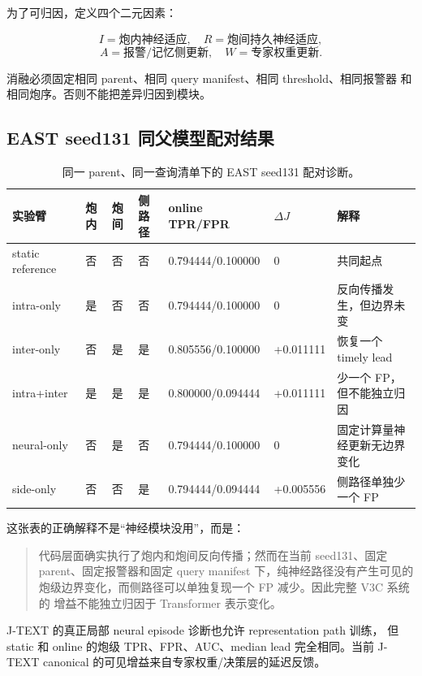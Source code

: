 \documentclass[11pt,a4paper]{article}
\begin{document}
为了可归因，定义四个二元因素：

\[
I=\text{炮内神经适应},\quad
R=\text{炮间持久神经适应},
\]
\[
A=\text{报警/记忆侧更新},\quad
W=\text{专家权重更新}.
\]

消融必须固定相同 parent、相同 query manifest、相同 threshold、相同报警器
和相同炮序。否则不能把差异归因到模块。

\subsection{EAST seed131 同父模型配对结果}

\begin{table}[H]
\centering
\caption{同一 parent、同一查询清单下的 EAST seed131 配对诊断。}
\label{tab:ablation}
\small
\begin{tabularx}{\textwidth}{p{28mm} C{10mm} C{10mm} C{16mm} p{31mm} C{19mm} Y}
\toprule
实验臂 & 炮内 & 炮间 & 侧路径 & online TPR/FPR & $\Delta J$ & 解释\\
\midrule
static reference & 否 & 否 & 否 & 0.794444/0.100000 & 0 & 共同起点\\
intra-only & 是 & 否 & 否 & 0.794444/0.100000 & 0 & 反向传播发生，但边界未变\\
inter-only & 否 & 是 & 是 & 0.805556/0.100000 & +0.011111 & 恢复一个 timely lead\\
intra+inter & 是 & 是 & 是 & 0.800000/0.094444 & +0.011111 & 少一个 FP，但不能独立归因\\
neural-only & 否 & 是 & 否 & 0.794444/0.100000 & 0 & 固定计算量神经更新无边界变化\\
side-only & 否 & 否 & 是 & 0.794444/0.094444 & +0.005556 & 侧路径单独少一个 FP\\
\bottomrule
\end{tabularx}
\end{table}

这张表的正确解释不是“神经模块没用”，而是：

\begin{quote}
代码层面确实执行了炮内和炮间反向传播；然而在当前 seed131、固定
parent、固定报警器和固定 query manifest 下，纯神经路径没有产生可见的
炮级边界变化，而侧路径可以单独复现一个 FP 减少。因此完整 V3C 系统的
增益不能独立归因于 Transformer 表示变化。
\end{quote}

J-TEXT 的真正局部 neural episode 诊断也允许 representation path 训练，
但 static 和 online 的炮级 TPR、FPR、AUC、median lead 完全相同。当前
J-TEXT canonical 的可见增益来自专家权重/决策层的延迟反馈。
\end{document}
